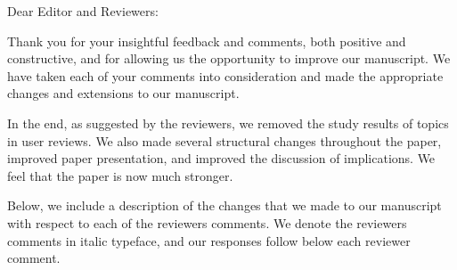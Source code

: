 \documentclass[8pt]{letter} %
\begin{document}
\let\raggedleft\raggedright                %

\newcommand{\response}[1]{{\bf Response.} #1}

\newcommand{\comment}[2]{
  \stepcounter{commentCounter}
  \vspace{2em}
  {\bf Comment R#1.\arabic{commentCounter}.} {\em #2}
  }
 
\begin{letter}{}

\address{
Weiyi Shang\\
EV 3.129, 1515 Ste. Catherine Street West\\
Department of Computer Science and Software Engineering, Concordia University\\ 
Montreal, QC, Canada H3G 1M8 \\
1 514-848-2424 ext. 7801\\
} 



\opening{Dear Editor and Reviewers:} 
 
\noindent Thank you for your insightful feedback and comments, both positive and constructive, and for allowing us the opportunity to improve our manuscript. We have taken each of your comments into consideration and made the appropriate changes and extensions to our manuscript. 

In the end, as suggested by the reviewers, we removed the study results of topics in user reviews. We also made several structural changes throughout the paper, improved paper presentation, and improved the discussion of implications. We feel that the paper is now much stronger.



Below, we include a description of the changes that we made to our manuscript with respect to each of the reviewers comments. We denote the reviewers comments in italic typeface, and our responses follow below each reviewer comment.





\end{letter}
\end{document}
